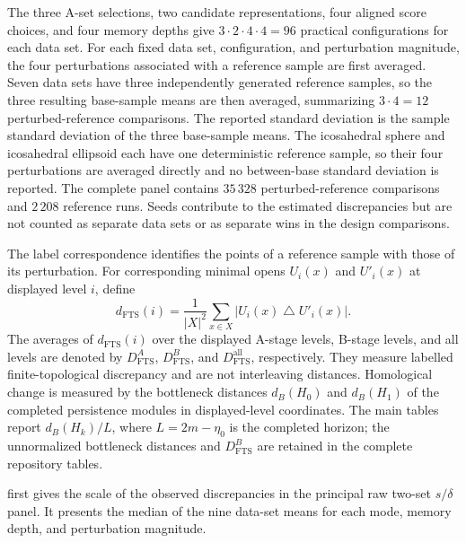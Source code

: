\documentclass[a4paper,11pt]{article}
\theoremstyle{definition}
\theoremstyle{remark}
\begin{document}
The three A-set selections, two candidate representations, four aligned score choices, and four memory depths give $3\cdot2\cdot4\cdot4=96$ practical configurations for each data set. For each fixed data set, configuration, and perturbation magnitude, the four perturbations associated with a reference sample are first averaged. Seven data sets have three independently generated reference samples, so the three resulting base-sample means are then averaged, summarizing $3\cdot4=12$ perturbed-reference comparisons. The reported standard deviation is the sample standard deviation of the three base-sample means. The icosahedral sphere and icosahedral ellipsoid each have one deterministic reference sample, so their four perturbations are averaged directly and no between-base standard deviation is reported. The complete panel contains $35\,328$ perturbed-reference comparisons and $2\,208$ reference runs. Seeds contribute to the estimated discrepancies but are not counted as separate data sets or as separate wins in the design comparisons.

The label correspondence identifies the points of a reference sample with those of its perturbation. For corresponding minimal opens $U_i(x)$ and $U'_i(x)$ at displayed level $i$, define
$$
d_{\mathrm{FTS}}(i)=\frac1{|X|^2}\sum_{x\in X}|U_i(x)\mathbin\triangle U'_i(x)|.
$$
The averages of $d_{\mathrm{FTS}}(i)$ over the displayed A-stage levels, B-stage levels, and all levels are denoted by $D_{\mathrm{FTS}}^A$, $D_{\mathrm{FTS}}^B$, and $D_{\mathrm{FTS}}^{\mathrm{all}}$, respectively. They measure labelled finite-topological discrepancy and are not interleaving distances. Homological change is measured by the bottleneck distances $d_B(H_0)$ and $d_B(H_1)$ of the completed persistence modules in displayed-level coordinates. The main tables report $d_B(H_k)/L$, where $L=2m-\eta_0$ is the completed horizon; the unnormalized bottleneck distances and $D_{\mathrm{FTS}}^B$ are retained in the complete repository tables.

 first gives the scale of the observed discrepancies in the principal raw two-set $s/\delta$ panel. It presents the median of the nine data-set means for each mode, memory depth, and perturbation magnitude.
\end{document}
